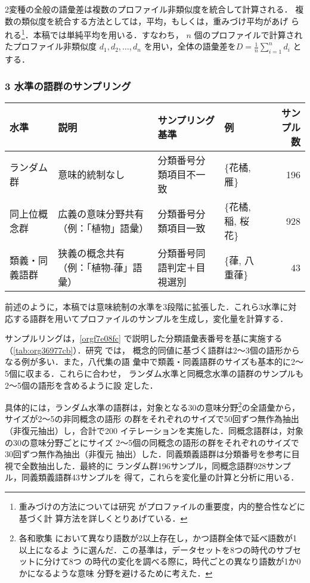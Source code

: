 \documentclass[submit]{ipsj}
\renewcommand{\ref}{\cref}
\begin{document}
2変種の全般の語彙差は複数のプロファイル非類似度を統合して計算される．
複数の類似度を統合する方法としては，平均，もしくは，重みづけ平均があげ
られる\footnote{重みづけの方法については研究 \cite{Ruette2014Semantic} がプロファイルの重要度，内的整合性などに基づく計
算方法を詳しくとりあげている．}．本稿では単純平均を用いる．すなわち，
\(n\) 個のプロファイルで計算されたプロファイル非類似度 \(d_1, d_2,
\ldots, d_n\) を用い，全体の語彙差を\(D=\frac{1}{n} \sum_{i=1}^{n}
d_i\) とする．
\subsubsection{3 水準の語群のサンプリング\label{org82537ba}}
\label{sec:org51897b3}
\begin{table*}[t]
\caption{\label{tab:org36977cb}3水準の語形集合のサンプル例}
\centering
\begin{tabular}{llllr}
水準 & 説明 & サンプリング基準 & 例 & サンプル数\\
\hline
ランダム群 & 意味的統制なし & 分類番号分類項目不一致 & \{花橘, 雁\} & 196\\
同上位概念群 & 広義の意味分野共有（例：「植物」語彙） & 分類番号分類項目一致 & \{花橘, 稲, 桜花\} & 928\\
類義・同義語群 & 狭義の概念共有（例：「植物-葎」語彙） & 分類番号同語判定＋目視選別 & \{葎, 八重葎\} & 43\\
\end{tabular}
\end{table*}

前述のように，本稿では意味統制の水準を3段階に拡張した．これら3水準に対
応する語群を用いてプロファイルのサンプルを生成し，変化量を計算する．

サンプルリングは，\ref{orgf7e08fc} で説明した分類語彙表番号を基に実施する
（\ref{tab:org36977cb}）．研究 \cite{Speelman2003Profilebased} では，
概念的同値に基づく語群は2～3個の語形からなる例が多い．また，八代集の語
彙中で類義・同義語群のサイズも基本的に2～5個に収まる．これらに合わせ，
ランダム水準と同概念水準の語群のサンプルも2～5個の語形を含めるように設
定した．

具体的には，ランダム水準の語群は，対象となる30の意味分野\footnote{各和歌集
において異なり語数が2以上存在し，かつ語群全体で延べ語数が1以上になるよ
うに選んだ．この基準は，データセットを8つの時代のサブセットに分けて8つ
の時代の変化を調べる際に，時代ごとの異なり語数が1か0かになるような意味
分野を避けるために考えた．}の全語彙から，サイズが2～5の非同概念の語形
の群をそれぞれのサイズで50回ずつ無作為抽出（非復元抽出）し，合計で200
イテレーションを実施した．同概念語群は，対象の30の意味分野ごとにサイズ
2～5個の同概念の語形の群をそれぞれのサイズで30回ずつ無作為抽出（非復元
抽出）した．同義類義語群は分類番号を参考に目視で全数抽出した．最終的に
ランダム群196サンプル，同概念語群928サンプル，同義類義語群43サンプルを
得て，これらを変化量の計算と分析に用いる．
\end{document}

